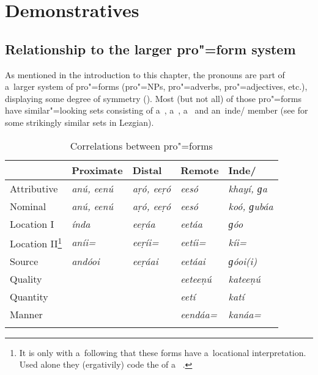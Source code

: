 \section{Demonstratives}
\label{sec:5-3}

\subsection{Relationship to the larger pro"=form system}
\label{subsec:5-2-1}


As mentioned in the introduction to this chapter, the  pronouns are part of a~larger system of pro"=forms (pro"=NPs, pro"=adverbs, pro"=adjectives, etc.), displaying some degree of symmetry (). Most (but not all) of those pro"=forms have similar"=looking sets consisting of a~, a~, a~ and an~inde/ member (see \citealt[187--188]{haspelmath1993} for some strikingly similar sets in Lezgian).



\begin{table}[ht]
\caption{Correlations between pro"=forms}
\begin{tabularx}{\textwidth}{ Q Q Q Q Q }
\lsptoprule
&
Proximate
&
Distal
&
Remote
&
Inde/{\allowbreak}\\\hline
Attributive &
\textit{anú, eenú} &
\textit{aṛó, eeṛó} &
\textit{eesó} &
\textit{khayí, ɡa} \\
Nominal &
\textit{anú, eenú} &
\textit{aṛó, eeṛó} &
\textit{eesó} &
\textit{koó, ɡubáa} \\
Location I &
\textit{índa} &
\textit{eeṛáa} &
\textit{eetáa} &
\textit{ɡóo} \\
Location II\footnote{It is only with a~following  that these forms have a~locational interpretation. Used alone they (ergativily) code the  of a~  .} &
\textit{aníi=} &
\textit{eeṛíi=} &
\textit{eetíi=} &
\textit{kíi=} \\
Source &
\textit{andóoi} &
\textit{eeṛáai} &
\textit{eetáai} &
\textit{ɡóoi(i)} \\
Quality &
&
&
\textit{eeteeṇú} &
\textit{kateeṇú} \\
Quantity &
&
&
\textit{eetí} &
\textit{katí} \\
Manner &
&
&
\textit{eendáa=} &
\textit{kanáa=} \\\lspbottomrule
\end{tabularx}
\label{tab:5-2}
\end{table}

